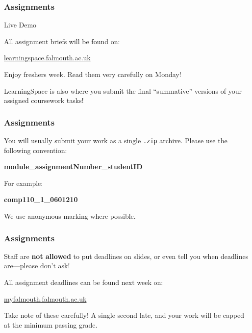 \begin{frame}
	\frametitle{Assignments}
	
	Live Demo
	
	\vspace{3em}
	
	All assignment briefs will be found on:
	
	\vspace{0.5em}
	
	\indent \url{learningspace.falmouth.ac.uk}
	
	\vspace{0.5em}
	
	Enjoy freshers week. Read them very carefully on Monday!
	
	\vspace{0.5em}
	
	LearningSpace is also where you submit the final ``summative'' versions of your assigned coursework tasks!
	
\end{frame}

\begin{frame}
	\frametitle{Assignments}
	
	You will usually submit your work as a single \texttt{.zip} archive. Please use the following convention:
	
	\begin{large}
		\begin{center}
			\textbf{module\_assignmentNumber\_studentID}
		\end{center}
	\end{large}
	
	For example:
	
	\begin{Large}
		\begin{center}
			\textbf{comp110\_1\_0601210}
		\end{center}
	\end{Large}
	
	\vspace{1em}
	
	We use anonymous marking where possible.

\end{frame}

\begin{frame}
	\frametitle{Assignments}
	
	Staff are \textbf{not allowed} to put deadlines on slides, or even tell you when deadlines are---please don't ask!
	
	\vspace{2em}
	
	All assignment deadlines can be found next week on:
	
	\vspace{1em}
	
	\indent \url{myfalmouth.falmouth.ac.uk}
	
	\vspace{1em}
	
	Take note of these carefully! A single second late, and your work will be capped at the minimum passing grade.
	
\end{frame}

